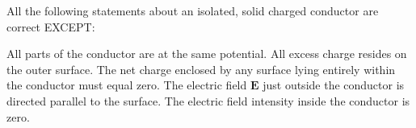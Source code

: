 \begin{questions}\setcounter{question}{4}\question
All the following statements about an isolated, solid charged conductor are correct EXCEPT:

\begin{choices}
\choice All parts of the conductor are at the same potential.
\choice All excess charge resides on the outer surface.
\choice The net charge enclosed by any surface lying entirely within the conductor must equal zero.
\choice The electric field $\mathbf{E}$ just outside the conductor is directed parallel to the surface.
\choice The electric field intensity inside the conductor is zero.
\end{choices}\end{questions}

